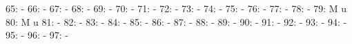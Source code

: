 \documentclass[nojss]{jss}
\begin{document}
\begin{Schunk}
\begin{Soutput}
 65:                                                                          -
 66:                                                                          -
 67:                                                                          -
 68:                                                                          -
 69:                                                                          -
 70:                                                                          -
 71:                                                                          -
 72:                                                                          -
 73:                                                                          -
 74:                                                                          -
 75:                                                                          -
 76:                                                                          -
 77:                                                                          -
 78:                                                                          -
 79:                                          M                               u
 80:                                          M                               u
 81:                                                                          -
 82:                                                                          -
 83:                                                                          -
 84:                                                                          -
 85:                                                                          -
 86:                                                                          -
 87:                                                                          -
 88:                                                                          -
 89:                                                                          -
 90:                                                                          -
 91:                                                                          -
 92:                                                                          -
 93:                                                                          -
 94:                                                                          -
 95:                                                                          -
 96:                                                                          -
 97:                                                                          -

\end{Soutput}
\end{Schunk}
\end{document}

